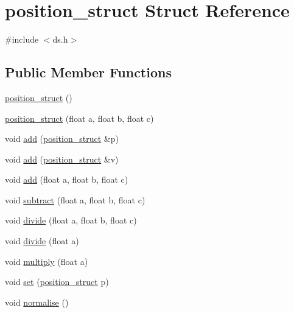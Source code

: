 \hypertarget{structposition__struct}{}\section{position\+\_\+struct Struct Reference}
\label{structposition__struct}


{\ttfamily \#include $<$ds.\+h$>$}

\subsection*{Public Member Functions}
\begin{DoxyCompactItemize}
\item 
\hyperlink{structposition__struct_ac7f00deb9894f468941c2ba94952e413}{position\+\_\+struct} ()
\item 
\hyperlink{structposition__struct_aca4580e3bd7d4a5c6c33cc0002bd0c0f}{position\+\_\+struct} (float a, float b, float c)
\item 
void \hyperlink{structposition__struct_a1b254c7036923536785ec76af484b256}{add} (\hyperlink{structposition__struct}{position\+\_\+struct} \&p)
\item 
void \hyperlink{structposition__struct_a75c7660fe1b6fa150d43f492844787bb}{add} (\hyperlink{structposition__struct}{position\+\_\+struct} \&v)
\item 
void \hyperlink{structposition__struct_a1ec64801515a58355a47deb57a07d455}{add} (float a, float b, float c)
\item 
void \hyperlink{structposition__struct_aef68337f141a745e3feb2251c048a9b4}{subtract} (float a, float b, float c)
\item 
void \hyperlink{structposition__struct_a5ea238483b364e8e6524b34ba2b1cba3}{divide} (float a, float b, float c)
\item 
void \hyperlink{structposition__struct_a38d087be70ab691959d1cb687de6a482}{divide} (float a)
\item 
void \hyperlink{structposition__struct_a15e05428c7ba9b16deb78f5a68fe43c8}{multiply} (float a)
\item 
void \hyperlink{structposition__struct_aee1e2222ba99e6401d0526dc9e3c7f50}{set} (\hyperlink{structposition__struct}{position\+\_\+struct} p)
\item 
void \hyperlink{structposition__struct_a070caabbd4466c5c50b409f0377ee68a}{normalise} ()
\end{DoxyCompactItemize}
